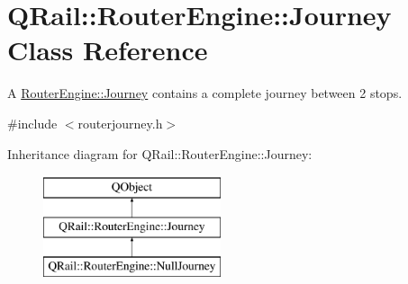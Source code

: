 \hypertarget{classQRail_1_1RouterEngine_1_1Journey}{}\section{Q\+Rail\+::Router\+Engine\+::Journey Class Reference}
\label{classQRail_1_1RouterEngine_1_1Journey}


A \mbox{\hyperlink{classQRail_1_1RouterEngine_1_1Journey}{Router\+Engine\+::\+Journey}} contains a complete journey between 2 stops.  




{\ttfamily \#include $<$routerjourney.\+h$>$}

Inheritance diagram for Q\+Rail\+::Router\+Engine\+::Journey\+:\begin{figure}[H]
\begin{center}
\leavevmode
\includegraphics[height=3.000000cm]{classQRail_1_1RouterEngine_1_1Journey}
\end{center}
\end{figure}
